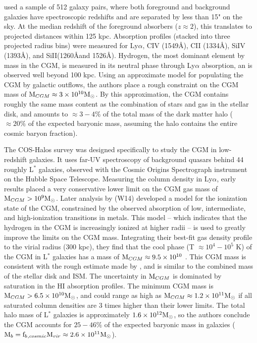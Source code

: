 \textbf{\citet{Steidel2010}} used a sample of 512 galaxy pairs, where
both foreground and background galaxies have spectroscopic redshifts
and are separated by less than 15" on the sky. At the median redshift
of the foreground absorbers ($z\approx 2$), this translates to
projected distances within 125 kpc. Absorption profiles (stacked into
three projected radius bins) were measured for Ly$\alpha$, CIV
(1549\AA), CII (1334\AA), SiIV (1393\AA), and SiII(1260\AA and
1526\AA). Hydrogen, the most dominant element by mass in the CGM, is
measured in its neutral phase through Ly$\alpha$ absorption, an is
observed well beyond 100 kpc. Using an approximate model for
populating the CGM by galactic outflows, the authors place a rough
constraint on the CGM mass of $\textrm{M}{}_{CGM} \approx 3\times 10^{10}
\textrm{M}_\odot{}$. By this approximation, the CGM contains roughly the same
mass content as the combination of stars and gas in the stellar disk,
and amounts to $\approx 3-4\%$ of the total mass of the dark matter
halo ($\approx 20\%$ of the expected baryonic mass, assuming the halo
contains the entire cosmic baryon fraction).

The COS-Halos survey \citep{Tumlinson2011} was designed specifically
to study the CGM in low-redshift galaxies. It uses far-UV spectroscopy
of background quasars behind 44 roughly L$^*$ galaxies, observed with
the Cosmic Origins Spectrograph instrument on the Hubble Space
Telescope. Measuring the column density in Ly$\alpha$, early results
\citep{Thom2012,Werk2013} placed a very conservative lower limit on
the CGM gas mass of $\textrm{M}{}_{CGM} > 10^9 \textrm{M}_\odot{}$. Later analysis by
\textbf{\citet{Werk2014}} (W14) developed a model for the ionization
state of the CGM, constrained by the observed absorption of low,
intermediate, and high-ionization transitions in metals. This model --
which indicates that the hydrogen in the CGM is increasingly ionized
at higher radii -- is used to greatly improve the limits on the CGM
mass. Integrating their best-fit gas density profile to the virial
radius (300 kpc), they find that the cool phase (T $\approx 10^4 -
10^5$ K) of the CGM in L$^*$ galaxies has a mass of $\textrm{M}{}_{CGM}
\approx 9.5\times 10^{10}$ \Msun{}. This CGM mass is consistent with the
rough estimate made by \citet{Steidel2010}, and is similar to the
combined mass of the stellar disk and ISM. The uncertainty in
$\textrm{M}{}_{CGM}$ is dominated by saturation in the HI absorption
profiles. The minimum CGM mass is $\textrm{M}{}_{CGM} > 6.5\times 10^{10}
\textrm{M}_\odot$, and could range as high as $\textrm{M}{}_{CGM} \approx
1.2\times 10^{11} \textrm{M}_\odot{}$ if all saturated column densities are 3 times
higher than their lower limits. The total halo mass of L$^*$ galaxies
is approximately $1.6\times 10^{12}\textrm{M}_\odot{}$, so the authors conclude the
CGM accounts for $25-46\%$ of the expected baryonic mass in galaxies
($\textrm{M}{}_{b} = \textrm{f\ensuremath{_b}}{}_{,cosmic} \textrm{M\ensuremath{_{vir}}}{} \approx 2.6\times 10^{11}
\textrm{M}_\odot{}$).

